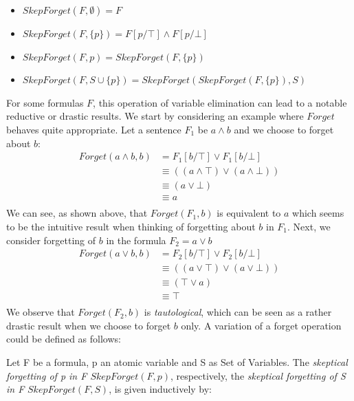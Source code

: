  \begin{itemize}
 \item $\mathit{SkepForget(F,\emptyset)} = F$
 \item $\mathit{SkepForget(F,\{p\})} = F[p/\top] \land F[p/\bot]$
 \item $\mathit{SkepForget}(F,p) = \mathit{SkepForget}(F,\{p\})$
 \item $\mathit{SkepForget(F,S \cup \{p\})} = \mathit{SkepForget(SkepForget(F,\{p\}), S)}$
 \end{itemize}For some formulas $F$, this operation of variable elimination can lead to a notable reductive or drastic results. 
                We start by considering an example where $\mathit{Forget}$ behaves quite appropriate. 
                Let a sentence $F_1$ be $a \land b$ and we choose to forget about $b$:\begin{align*}
Forget(a \land b,b)&=F_1[b/\top] \lor F_1[b/\bot]\\ &\equiv ((a \land \top) \lor (a \land \bot)) \\
 &\equiv (a \lor \bot) \\
 &\equiv a \\
\end{align*}We can see, as shown above, that $\mathit{Forget(F_1,b)}$ is equivalent to $a$ which seems to be the intuitive result when thinking of forgetting about $b$ in $F_1$. 
                    Next, we consider forgetting of $b$ in the formula $F_2 = a \lor b$\begin{align*}
Forget(a \lor b,b)&=F_2[b/\top] \lor F_2[b/\bot]\\ &\equiv ((a \lor \top) \lor (a \lor \bot)) \\
 &\equiv (\top \lor a) \\
 &\equiv \top \\
\end{align*}We observe that $\mathit{Forget(F_2,b)}$ is \emph{tautological}, which can be seen as a rather drastic result when we choose to forget $b$ only.
                A variation of a forget operation could be defined as follows:\begin{definition}
Let F be a formula, p an atomic variable and S as Set of Variables. The \emph{skeptical forgetting of p in F $\mathit{SkepForget}(F,p)$}, respectively, the \emph{skeptical forgetting of S in F} $\mathit{SkepForget(F,S)}$, is given inductively by:
\end{definition}
 
